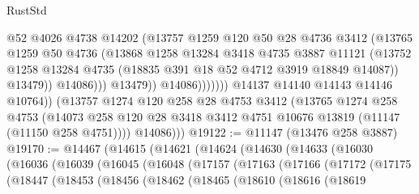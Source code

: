 \begin{lexlean}{RustStd}
\begin{coremodule}
                                  @52
                                  @4026
                                  @4738
                                  @14202
                                  (@13757
                                    @1259
                                    @120
                                    @50
                                    @28
                                    @4736
                                    @3412
                                    (@13765
                                      @1259
                                      @50
                                      @4736
                                      (@13868
                                        @1258
                                        @13284
                                        @3418
                                        @4735
                                        @3887
                                        @11121
                                        (@13752
                                          @1258
                                          @13284
                                          @4735
                                          (@18835 @391 @18 @52 @4712 @3919 @18849 @14087))
                                        @13479))
                                    @14086)))
                              @13479))
                          @14086)))))))
            @14137
            @14140
            @14143
            @14146
            @10764))
        (@13757
          @1274
          @120
          @258
          @28
          @4753
          @3412
          (@13765
            @1274
            @258
            @4753
            (@14073 @258 @120 @28 @3418 @3412 @4751 @10676 @13819 (@11147 (@11150 @258 @4751))))
          @14086)))
@19122 := @11147 (@13476 @258 @3887)
@19170 := @14467
    (@14615
      (@14621
        (@14624
          (@14630
            (@14633
              (@16030
                (@16036
                  (@16039
                    (@16045
                      (@16048
                        (@17157
                          (@17163
                            (@17166
                              (@17172
                                (@17175
                                  (@18447
                                    (@18453
                                      (@18456
                                        (@18462
                                          (@18465
                                            (@18610
                                              (@18616
                                                (@18619

\end{coremodule}
\end{lexlean}
